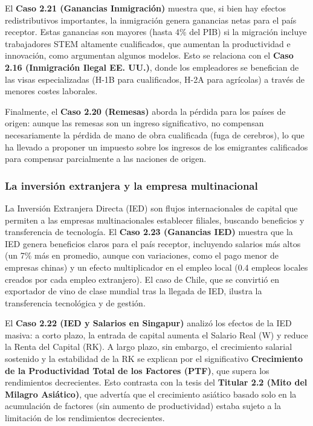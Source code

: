El \textbf{Caso 2.21 (Ganancias Inmigración)} muestra que, si bien hay efectos redistributivos importantes, la inmigración genera ganancias netas para el país receptor. Estas ganancias son mayores (hasta 4\% del PIB) si la migración incluye trabajadores STEM altamente cualificados, que aumentan la productividad e innovación, como argumentan algunos modelos. Esto se relaciona con el \textbf{Caso 2.16 (Inmigración Ilegal EE. UU.)}, donde los empleadores se benefician de las visas especializadas (H-1B para cualificados, H-2A para agrícolas) a través de menores costes laborales.

Finalmente, el \textbf{Caso 2.20 (Remesas)} aborda la pérdida para los países de origen: aunque las remesas son un ingreso significativo, no compensan necesariamente la pérdida de mano de obra cualificada (fuga de cerebros), lo que ha llevado a proponer un impuesto sobre los ingresos de los emigrantes calificados para compensar parcialmente a las naciones de origen.

\subsubsection{La inversión extranjera y la empresa multinacional}
La Inversión Extranjera Directa (IED) son flujos internacionales de capital que permiten a las empresas multinacionales establecer filiales, buscando beneficios y transferencia de tecnología. El \textbf{Caso 2.23 (Ganancias IED)} muestra que la IED genera beneficios claros para el país receptor, incluyendo salarios más altos (un 7\% más en promedio, aunque con variaciones, como el pago menor de empresas chinas) y un efecto multiplicador en el empleo local (0.4 empleos locales creados por cada empleo extranjero). El caso de Chile, que se convirtió en exportador de vino de clase mundial tras la llegada de IED, ilustra la transferencia tecnológica y de gestión.

El \textbf{Caso 2.22 (IED y Salarios en Singapur)} analizó los efectos de la IED masiva: a corto plazo, la entrada de capital aumenta el Salario Real (W) y reduce la Renta del Capital (RK). A largo plazo, sin embargo, el crecimiento salarial sostenido y la estabilidad de la RK se explican por el significativo \textbf{Crecimiento de la Productividad Total de los Factores (PTF)}, que supera los rendimientos decrecientes. Esto contrasta con la tesis del \textbf{Titular 2.2 (Mito del Milagro Asiático)}, que advertía que el crecimiento asiático basado solo en la acumulación de factores (sin aumento de productividad) estaba sujeto a la limitación de los rendimientos decrecientes.

